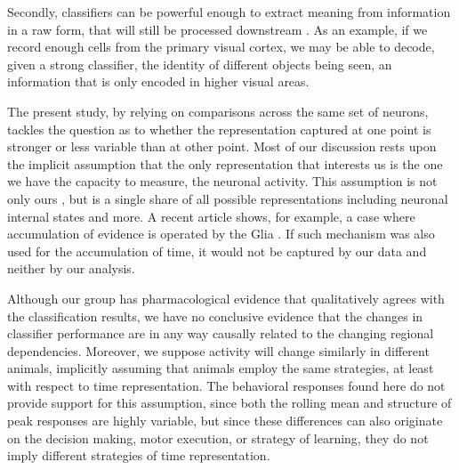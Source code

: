     Secondly, classifiers can be powerful enough to extract meaning from information in a raw form, that will still be processed downstream \cite{king2014characterizing}. As an example, if we record enough cells from the primary visual cortex, we may be able to decode, given a strong classifier, the identity of different objects being seen, an information that is only encoded in higher visual areas. 
    
    The present study, by relying on comparisons across the same set of neurons, tackles the question as to whether the representation captured at one point is stronger or less variable than at other point. Most of our discussion rests upon the implicit assumption that the only representation that interests us is the one we have the capacity to measure, the neuronal activity. This assumption is not only ours \cite{bakhurin2017differential}, but is a single share of all possible representations including neuronal internal states and more. A recent article shows, for example, a case where accumulation of evidence is operated by the Glia \cite{mu2019glia}. If such mechanism was also used for the accumulation of time, it would not be captured by our data and neither by our analysis. 
    
    Although our group has pharmacological evidence that qualitatively agrees with the classification results, we have no conclusive evidence that the changes in classifier performance are in any way causally related to the changing regional dependencies. Moreover, we suppose activity will change similarly in different animals, implicitly assuming that animals employ the same strategies, at least with respect to time representation. The behavioral responses found here do not provide support for this assumption, since both the rolling mean and structure of peak responses are highly variable, but since these differences can also originate on the decision making, motor execution, or strategy of learning, they do not imply different strategies of time representation.



